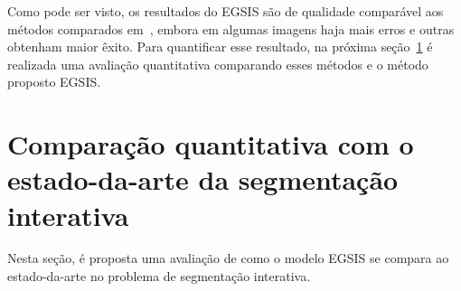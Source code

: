 \begin{figure}[h!]
        \captionsetup{width=12cm}
		\centering
\end{figure}
\FloatBarrier{}



Como pode ser visto, os resultados do \gls{EGSIS} são de qualidade
comparável aos métodos comparados em~\cite{wang2023review}, embora em
algumas imagens haja mais erros e outras obtenham maior êxito. Para
quantificar esse resultado, na próxima
seção~\ref{sec:comparacao-estado-da-arte} é realizada uma avaliação
quantitativa comparando esses métodos e o método proposto \gls{EGSIS}.


\section{Comparação quantitativa com o estado-da-arte da segmentação interativa}\label{sec:comparacao-estado-da-arte}

Nesta seção, é proposta uma avaliação de como o modelo \gls{EGSIS} se
compara ao estado-da-arte no problema de segmentação interativa.

